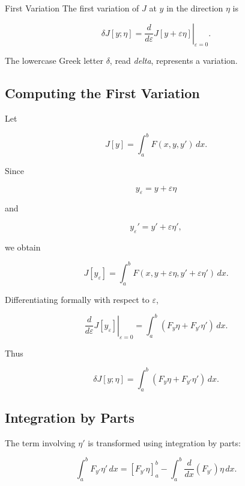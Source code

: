 \begin{definitionbox}{First Variation}
The first variation of \(J\) at \(y\) in the direction \(\eta\) is

\[
\boxed{
\delta J[y;\eta]
=
\left.
\frac{d}{d\varepsilon}
J[y+\varepsilon\eta]
\right|_{\varepsilon=0}.
}
\]
\end{definitionbox}

The lowercase Greek letter \(\delta\), read \emph{delta}, represents a
variation.

\subsection{Computing the First Variation}
\label{subsec:computing-first-variation}

Let

\[
J[y]
=
\int_a^b
F(x,y,y')\,dx.
\]

Since

\[
y_\varepsilon
=
y+\varepsilon\eta
\]

and

\[
y_\varepsilon'
=
y'+\varepsilon\eta',
\]

we obtain

\[
J[y_\varepsilon]
=
\int_a^b
F(x,y+\varepsilon\eta,y'+\varepsilon\eta')\,dx.
\]

Differentiating formally with respect to \(\varepsilon\),

\[
\left.
\frac{d}{d\varepsilon}
J[y_\varepsilon]
\right|_{\varepsilon=0}
=
\int_a^b
\left(
F_y\eta
+
F_{y'}\eta'
\right)\,dx.
\]

Thus

\[
\boxed{
\delta J[y;\eta]
=
\int_a^b
\left(
F_y\eta
+
F_{y'}\eta'
\right)\,dx.
}
\]

\subsection{Integration by Parts}
\label{subsec:variational-integration-by-parts}

The term involving \(\eta'\) is transformed using integration by parts:

\[
\int_a^b
F_{y'}\eta'\,dx
=
\left[
F_{y'}\eta
\right]_a^b
-
\int_a^b
\frac{d}{dx}
\left(
F_{y'}
\right)\eta\,dx.
\]

